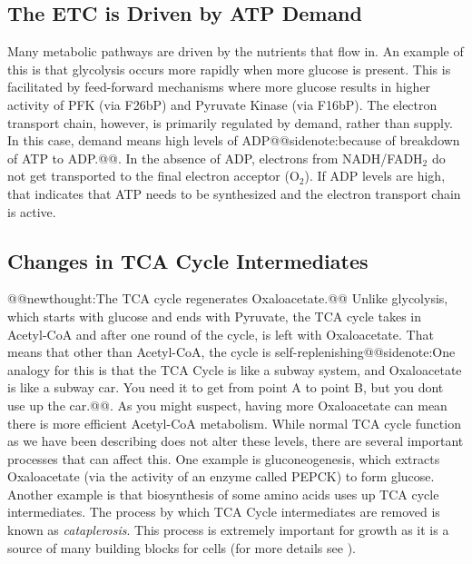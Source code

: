 \documentclass{tufte-handout}
\makeatletter
\def\newthought#1{@@newthought:#1@@}
\def\sidenote#1{@@sidenote:#1@@}
\makeatother
\begin{document}
\subsection{The ETC is Driven by ATP Demand}

Many metabolic pathways are driven by the nutrients that flow in.  An example of this is that glycolysis occurs more rapidly when more glucose is present.  This is facilitated by feed-forward mechanisms where more glucose results in higher activity of PFK (via F26bP) and Pyruvate Kinase (via F16bP).  The electron transport chain, however, is primarily regulated by demand, rather than supply.  In this case, demand means high levels of ADP\sidenote{because of breakdown of ATP to ADP.}.  In the absence of ADP, electrons from NADH/FADH$_2$ do not get transported to the final electron acceptor (O$_2$).  If ADP levels are high, that indicates that ATP needs to be synthesized and the electron transport chain is active.  

\subsection{Changes in TCA Cycle Intermediates}

\newthought{The TCA cycle regenerates Oxaloacetate.}  Unlike glycolysis, which starts with glucose and ends with Pyruvate, the TCA cycle takes in Acetyl-CoA and after one round of the cycle, is left with Oxaloacetate.  That means that other than Acetyl-CoA, the cycle is self-replenishing\sidenote{One analogy for this is that the TCA Cycle is like a subway system, and Oxaloacetate is like a subway car.  You need it to get from point A to point B, but you dont use up the car.}.  As you might suspect, having more Oxaloacetate can mean there is more efficient Acetyl-CoA metabolism.  While normal TCA cycle function as we have been describing does not alter these levels, there are several important processes that can affect this.  One example is gluconeogenesis, which extracts Oxaloacetate (via the activity of an enzyme called PEPCK) to form glucose.  Another example is that biosynthesis of some amino acids uses up TCA cycle intermediates.  The process by which TCA Cycle intermediates are removed is known as \emph{cataplerosis}.  This process is extremely important for growth as it is a source of many building blocks for cells (for more details see \citet{inigoInsOutsTCA2021}).
\end{document}
